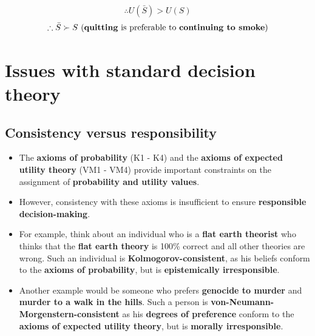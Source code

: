 \documentclass[11pt]{article}
\begin{document}
\[\therefore U(\bar{S}) > U(S)\]
\[\therefore \bar{S} \succ S \ \text{(\textbf{quitting} is preferable to \textbf{continuing to smoke})}\]

 \newpage
\section{Issues with standard decision theory}
\label{sec:org094a8ac}

\subsection{Consistency versus responsibility}
\label{sec:org3aad409}
\begin{itemize}
\item The \textbf{axioms of probability} (K1 - K4) and the \textbf{axioms of expected utility theory} (VM1 - VM4) provide important constraints on the assignment of \textbf{probability and utility values}.
\item However, consistency with these axioms is insufficient to ensure \textbf{responsible decision-making}.
\item For example, think about an individual who is a \textbf{flat earth theorist} who thinks that the \textbf{flat earth theory} is 100\% correct and all other theories are wrong. Such an individual is \textbf{Kolmogorov-consistent}, as his beliefs conform to the \textbf{axioms of probability}, but is \textbf{epistemically irresponsible}.
\item Another example would be someone who prefers \textbf{genocide to murder} and \textbf{murder to a walk in the hills}. Such a person is \textbf{von-Neumann-Morgenstern-consistent} as his \textbf{degrees of preference} conform to the \textbf{axioms of expected utility theory}, but is \textbf{morally irresponsible}.
\end{itemize}
\end{document}
